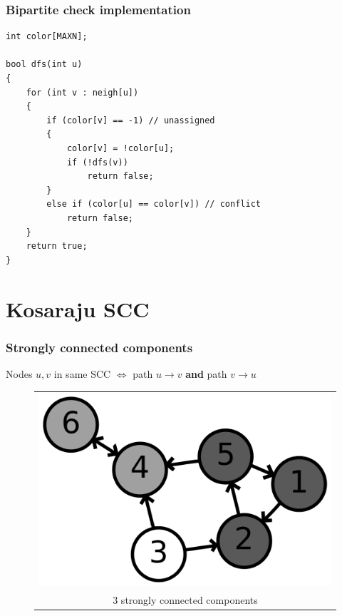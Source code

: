 \documentclass[12pt]{beamer}
\begin{document}
\begin{frame}[fragile]
\frametitle{Bipartite check implementation}
\begin{lstlisting}
int color[MAXN];

bool dfs(int u)
{
    for (int v : neigh[u])
    {
        if (color[v] == -1) // unassigned
        {
            color[v] = !color[u];
            if (!dfs(v))
                return false;
        }
        else if (color[u] == color[v]) // conflict
            return false;
    }
    return true;
}
\end{lstlisting}
\end{frame}

\section{Kosaraju SCC}

\begin{frame}
\frametitle{Strongly connected components}
Nodes $u,v$ in same SCC $\Leftrightarrow$ path $u \to v$ \textbf{and} path $v \to u$
\begin{figure}
\centering
\begin{tabular}{c}
\includegraphics[width=0.5\linewidth]{img/6n-scc} \\
3 strongly connected components
\end{tabular}
\end{figure}
\end{frame}
\end{document}
